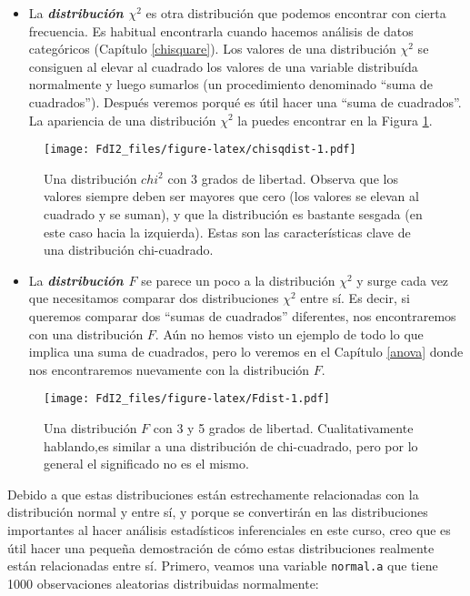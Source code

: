 \documentclass[spanish,]{book}
\providecommand{\tightlist}{%
  \setlength{\itemsep}{0pt}\setlength{\parskip}{0pt}}
\begin{document}
\begin{itemize}
\tightlist
\item
  La \textbf{\emph{distribución \(\chi^2\)}} es otra distribución que
  podemos encontrar con cierta frecuencia. Es habitual encontrarla
  cuando hacemos análisis de datos categóricos (Capítulo
  \ref{chisquare}). Los valores de una distribución \(\chi^2\) se
  consiguen al elevar al cuadrado los valores de una variable
  distribuída normalmente y luego sumarlos (un procedimiento denominado
  ``suma de cuadrados''). Después veremos porqué es útil hacer una
  ``suma de cuadrados''. La apariencia de una distribución \(\chi^2\) la
  puedes encontrar en la Figura \ref{fig:chisqdist}.
\end{itemize}

\begin{figure}
\centering
\texttt{[image: FdI2\_files/figure-latex/chisqdist-1.pdf]}
\caption{\label{fig:chisqdist}Una distribución \(chi^2\) con 3 grados de
libertad. Observa que los valores siempre deben ser mayores que cero
(los valores se elevan al cuadrado y se suman), y que la distribución es
bastante sesgada (en este caso hacia la izquierda). Estas son las
características clave de una distribución chi-cuadrado.}
\end{figure}

\begin{itemize}
\tightlist
\item
  La \textbf{\emph{distribución \(F\)}} se parece un poco a la
  distribución \(\chi^2\) y surge cada vez que necesitamos comparar dos
  distribuciones \(\chi^2\) entre sí. Es decir, si queremos comparar dos
  ``sumas de cuadrados'' diferentes, nos encontraremos con una
  distribución \(F\). Aún no hemos visto un ejemplo de todo lo que
  implica una suma de cuadrados, pero lo veremos en el Capítulo
  \ref{anova} donde nos encontraremos nuevamente con la distribución
  \(F\).
\end{itemize}

\begin{figure}
\centering
\texttt{[image: FdI2\_files/figure-latex/Fdist-1.pdf]}
\caption{\label{fig:Fdist}Una distribución \(F\) con 3 y 5 grados de
libertad. Cualitativamente hablando,es similar a una distribución de
chi-cuadrado, pero por lo general el significado no es el mismo.}
\end{figure}

Debido a que estas distribuciones están estrechamente relacionadas con
la distribución normal y entre sí, y porque se convertirán en las
distribuciones importantes al hacer análisis estadísticos inferenciales
en este curso, creo que es útil hacer una pequeña demostración de cómo
estas distribuciones realmente están relacionadas entre sí. Primero,
veamos una variable \texttt{normal.a} que tiene 1000 observaciones
aleatorias distribuidas normalmente:
\end{document}
